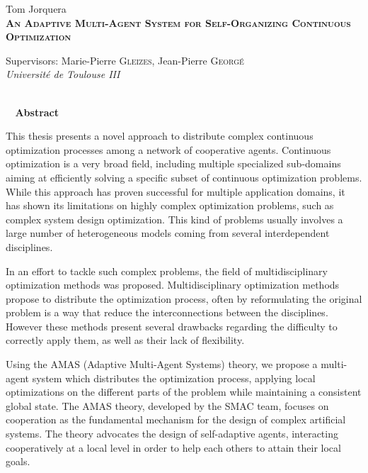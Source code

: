 \if@doubleinterligne\renewcommand{}\fi
  \thispagestyle{plain}
  \begin{center}
    \Large Tom Jorquera\\
    \addvspace{2mm}
    \textsc{\textbf{An Adaptive Multi-Agent System for Self-Organizing Continuous Optimization}}\\
	\addvspace{2mm}
    \begin{center}
   	 \large\normalfont Supervisors: Marie-Pierre \textsc{Gleizes}, Jean-Pierre \textsc{Georgé}\\
   	  \large\normalfont \emph{Université de Toulouse III}\\
     \end{center}
     \\
    \addvspace{3mm}
    \textbf{\hrulefill~ Abstract ~\hrulefill}\\  
    
  \end{center}
  \vspace{-0.3cm}
        
\normalsize \hspace{0.6cm}This thesis presents a novel approach to distribute complex continuous optimization processes among a network of cooperative agents. Continuous optimization is a very broad field, including multiple specialized sub-domains aiming at efficiently solving a specific subset of continuous optimization problems. While this approach has proven successful for multiple application domains, it has shown its limitations on highly complex optimization problems, such as complex system design optimization. This kind of problems usually involves a large number of heterogeneous models coming from several interdependent disciplines.

In an effort to tackle such complex problems, the field of multidisciplinary optimization methods was proposed. Multidisciplinary optimization methods propose to distribute the optimization process, often by reformulating the original problem is a way that reduce the interconnections between the disciplines. However these methods present several drawbacks regarding the difficulty to correctly apply them, as well as their lack of flexibility.

Using the AMAS (Adaptive Multi-Agent Systems) theory, we propose a multi-agent system which distributes the optimization process, applying local optimizations on the different parts of the problem while maintaining a consistent global state. The AMAS theory, developed by the SMAC team, focuses on cooperation as the fundamental mechanism for the design of complex artificial systems. The theory advocates the design of self-adaptive agents, interacting cooperatively at a local level in order to help each others to attain their local goals.

